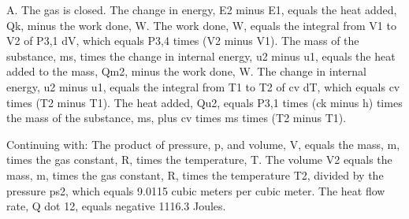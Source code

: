 A. The gas is closed.
The change in energy, E2 minus E1, equals the heat added, Qk, minus the work done, W.
The work done, W, equals the integral from V1 to V2 of P3,1 dV, which equals P3,4 times (V2 minus V1).
The mass of the substance, ms, times the change in internal energy, u2 minus u1, equals the heat added to the mass, Qm2, minus the work done, W.
The change in internal energy, u2 minus u1, equals the integral from T1 to T2 of cv dT, which equals cv times (T2 minus T1).
The heat added, Qu2, equals P3,1 times (ck minus h) times the mass of the substance, ms, plus cv times ms times (T2 minus T1).

Continuing with:
The product of pressure, p, and volume, V, equals the mass, m, times the gas constant, R, times the temperature, T.
The volume V2 equals the mass, m, times the gas constant, R, times the temperature T2, divided by the pressure ps2, which equals 9.0115 cubic meters per cubic meter.
The heat flow rate, Q dot 12, equals negative 1116.3 Joules.